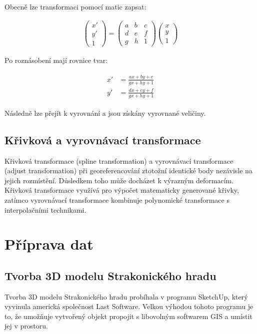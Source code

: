 \documentclass[thesis=M,czech]{FITthesis}[2012/06/26]
\begin{document}
Obecně lze transformaci pomocí matic zapsat:

\begin{align} \label{proj_obec}
\begin{pmatrix}
x'\\ 
y'\\ 
1
\end{pmatrix} = 
\begin{pmatrix}
a & b & c\\ 
d & e & f\\ 
g & h & 1
\end{pmatrix} 
\begin{pmatrix}
x\\ 
y\\ 
1
\end{pmatrix}
\end{align}

Po roznásobení mají rovnice tvar:


\begin{align} \label{proj_roz}
\begin{split}
x' &= \frac{ax + by + c}{gx + hy + 1} \\
y' &=\frac{dx + ey + f}{gx + hy + 1}
\end{split}
\end{align}

Následně lze přejít k vyrovnání a jsou získány vyrovnané veličiny.

\section{Křivková a vyrovnávací transformace}
Křivková transformace (spline transformation) a vyrovnávací transformace (adjust transformation) při georeferencování ztotožní identické body nezávisle na jejich rozmístění. Důsledkem toho může docházet k výrazným deformacím. Křivková transformace využívá pro výpočet matematicky generované křivky, zatímco vyrovnávací transformace kombinuje polynomické transformace s interpolačními technikami. 






\chapter{Příprava dat}




\section{Tvorba 3D modelu Strakonického hradu}
Tvorba 3D modelu Strakonického hradu probíhala v programu SketchUp, který vyvinula americká společnost Last Software. Velkou výhodou tohoto programu je to, že umožňuje vytvořený objekt propojit s libovolným softwarem GIS a umístit jej v prostoru. 
\end{document}
